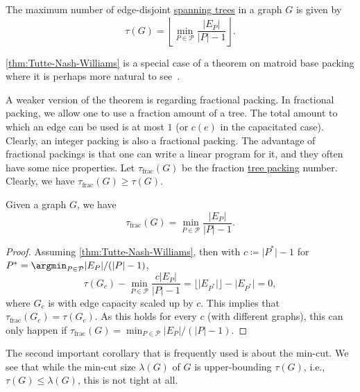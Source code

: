 \begin{theorem}\label{thm:Tutte-Nash-Williams}
	The maximum number of edge-disjoint \hyperref[def:spanning-tree]{spanning trees} in a graph \(G\) is given by
	\[
		\tau (G)
		= \left\lfloor \min _{P \in \mathcal{P} } \frac{\lvert E_P \rvert }{\lvert P \rvert - 1} \right\rfloor.
	\]
\end{theorem}

\begin{remark}
	\autoref{thm:Tutte-Nash-Williams} is a special case of a theorem on matroid base packing where it is perhaps more natural to see~\cite{schrijver2003combinatorial}.
\end{remark}

A weaker version of the theorem is regarding fractional packing. In fractional packing, we allow one to use a fraction amount of a tree. The total amount to which an edge can be used is at most \(1\) (or \(c(e)\) in the capacitated case). Clearly, an integer packing is also a fractional packing. The advantage of fractional packings is that one can write a linear program for it, and they often have some nice properties. Let \(\tau _{\text{frac} } (G)\) be the fraction \hyperref[prb:TP]{tree packing} number. Clearly, we have \(\tau _{\text{frac} }(G) \geq \tau (G)\).

\begin{corollary}\label{col:Tutte-Nash-Williams}
	Given a graph \(G\), we have
	\[
		\tau _{\text{frac} } (G)
		= \min _{P \in \mathcal{P} } \frac{\lvert E_P \rvert }{\lvert P \rvert - 1}.
	\]
\end{corollary}
\begin{proof}
	Assuming \autoref{thm:Tutte-Nash-Williams}, then with \(c \coloneqq \lvert P^{\ast} \rvert - 1\) for \(P^{\ast} = \argmin_{P \in \mathcal{P} } \lvert E_P \rvert / (\lvert P \rvert - 1)\),
	\[
		\tau (G_{c}) - \min _{P \in \mathcal{P} } \frac{c \lvert E_P \rvert }{\lvert P \rvert - 1}
		= \lfloor \lvert E_{P^{\ast} } \rvert \rfloor - \lvert E_{P^{\ast} } \rvert
		= 0,
	\]
	where \(G_c\) is with edge capacity scaled up by \(c\). This implies that \(\tau _{\text{frac} }(G_{c}) = \tau (G_{c})\). As this holds for every \(c\) (with different graphs), this can only happen if \(\tau _{\text{frac} }(G) = \min _{P \in \mathcal{P} } \lvert E_P \rvert / (\lvert P \rvert - 1)\).
\end{proof}

The second important corollary that is frequently used is about the min-cut. We see that while the min-cut size \(\lambda (G)\) of \(G\) is upper-bounding \(\tau (G)\), i.e., \(\tau (G) \leq \lambda (G)\), this is not tight at all.


